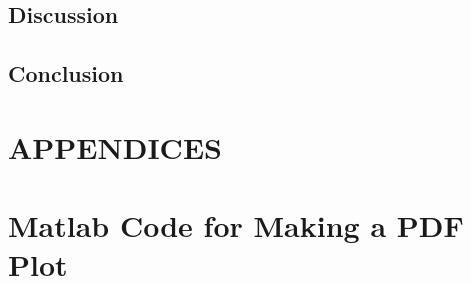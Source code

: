 \documentclass[letterpaper,12pt,titlepage,oneside,final]{book}
\theoremstyle{plain}
\let\origdoublepage\cleardoublepage
\newcommand{\clearemptydoublepage}{%
  \clearpage{\pagestyle{empty}\origdoublepage}}
\let\cleardoublepage\clearemptydoublepage
\begin{document}
\section{Discussion}

\section{Conclusion}



\appendix

\chapter*{APPENDICES}
\chapter[PDF Plots From Matlab]{Matlab Code for Making a PDF Plot}
\label{AppendixA}





\cleardoublepage %
\renewcommand*{\bibname}{References}




\nocite{*}
\end{document}
